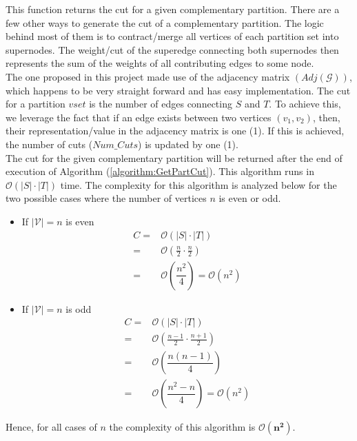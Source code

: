\documentclass[longpaper, english, final, times]{revdetua}
\begin{document}
				This function returns the cut for a given complementary partition. There are a few other ways to generate the cut of a complementary partition. The logic behind most of them is to contract/merge all vertices of each partition set into supernodes. The weight/cut of the superedge connecting both supernodes then represents the sum of the weights of all contributing edges to some node.\\
				
				The one proposed in this project made use of the adjacency matrix $(Adj(\mathcal{G}))$, which happens to be very straight forward and has easy implementation. The cut for a partition $vset$ is the number of edges connecting $S$ and $T$. To achieve this, we leverage the fact that if an edge exists between two vertices $(v_1, v_2)$, then, their representation/value in the adjacency matrix is one (1). If this is achieved, the number of cuts ($Num\_Cuts$) is updated by one (1).\\
				
				The cut for the given complementary partition will be returned after the end of execution of Algorithm (\ref{algorithm:GetPartCut}). This algorithm runs in $\mathcal{O}(|S|\cdot |T|)$ time. The complexity for this algorithm is analyzed below for the two possible cases where the number of vertices $n$ is even or odd. 
				\begin{itemize}
					\label{list:getpartcut}
					\item If $|\mathcal{V}|=n$ is even
					\begin{align*}
						C = & \mathcal{O}\left(|S|\cdot|T|\right)\\
						= & \mathcal{O}\left(\frac{n}{2}\cdot \frac{n}{2}\right)\\
						= & \mathcal{O}\left(\dfrac{n^2}{4}\right) = \mathcal{O}(n^2)
					\end{align*}
					\item If $|\mathcal{V}|=n$ is odd
					\begin{align*}
						C = & \mathcal{O}\left(|S|\cdot |T|\right)\\
						= & \mathcal{O}\left(\frac{n-1}{2}\cdot \frac{n+1}{2}\right)\\
						= & \mathcal{O}\left(\dfrac{n(n-1)}{4}\right) \\
						= & \mathcal{O}\left(\dfrac{n^2-n}{4}\right)  = \mathcal{O}(n^2)
					\end{align*}
				\end{itemize}
				Hence, for all cases of $n$ the complexity of this algorithm is $\mathbf{\mathcal{O}(n^2)}$.\\
			
\end{document}
